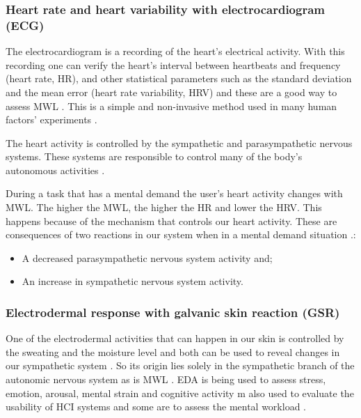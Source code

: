        \subsubsection{Heart rate and heart variability with electrocardiogram (ECG)}
        \label{subsubsec:ecg}
        
            The electrocardiogram is a recording of the heart's electrical activity. With this recording one can verify the heart's interval between heartbeats and frequency (heart rate, HR), and other statistical parameters such as the standard deviation and the mean error (heart rate variability, HRV) and these are a good way to assess MWL \cite{cain2007review}. This is a simple and non-invasive method used in many human factors' experiments \cite{mohanavelu2020cognitive, mansikka2016fighter, zhang2014detection}.
        
            The heart activity is controlled by the sympathetic and parasympathetic nervous systems. These systems are responsible to control many of the body's autonomous activities \cite{stanton2004handbook}. %
        
            During a task that has a mental demand the user's heart activity changes with MWL. The higher the MWL, the higher the HR and lower the HRV. This happens because of the mechanism that controls our heart activity. These are consequences of two reactions in our system when in a mental demand situation \cite{stanton2004handbook}.:
            
            \begin{itemize}
                \item A decreased parasympathetic nervous system activity and;
                \item An increase in sympathetic nervous system activity.
            \end{itemize}
    
        \subsubsection{Electrodermal response with galvanic skin reaction (GSR)}
        \label{subsubsec:gsr}
        
        One of the electrodermal activities that can happen in our skin is controlled by the sweating and the moisture level and both can be used to reveal changes in our sympathetic system \cite{nourbakhsh2012using, shi2007galvanic}. So its origin lies solely in the sympathetic branch of the autonomic nervous system as is MWL \cite{stanton2004handbook}. EDA is being used to assess stress, emotion, arousal, mental strain and cognitive activity \cite{nourbakhsh2012using, stanton2004handbook, shi2007galvanic}m also used to evaluate the usability of HCI systems \cite{shi2007galvanic} and some are to assess the mental workload \cite{zhang2014detection, borghini2014measuring}.
    
